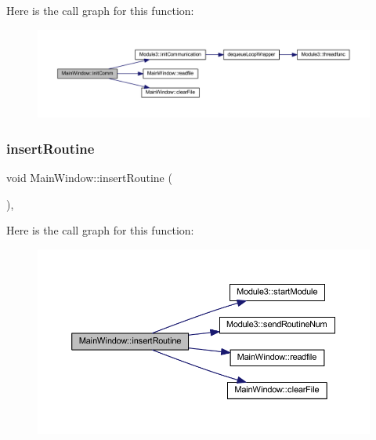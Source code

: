 Here is the call graph for this function\+:
\nopagebreak
\begin{figure}[H]
\begin{center}
\leavevmode
\includegraphics[width=350pt]{class_main_window_a3ae7677276119857e128f826c8b069c8_cgraph}
\end{center}
\end{figure}
\mbox{\label{class_main_window_a88b30e72fd13b54ddef7bf6e2bb08448}} 
\subsubsection{\texorpdfstring{insert\+Routine}{insertRoutine}}
{\footnotesize\ttfamily void Main\+Window\+::insert\+Routine (\begin{DoxyParamCaption}{ }\end{DoxyParamCaption})\hspace{0.3cm}{\ttfamily [private]}, {\ttfamily [slot]}}

Here is the call graph for this function\+:
\nopagebreak
\begin{figure}[H]
\begin{center}
\leavevmode
\includegraphics[width=350pt]{class_main_window_a88b30e72fd13b54ddef7bf6e2bb08448_cgraph}
\end{center}
\end{figure}
\mbox{\label{class_main_window_aadedb5af94649f8e8a16c6642aa7b319}} 
